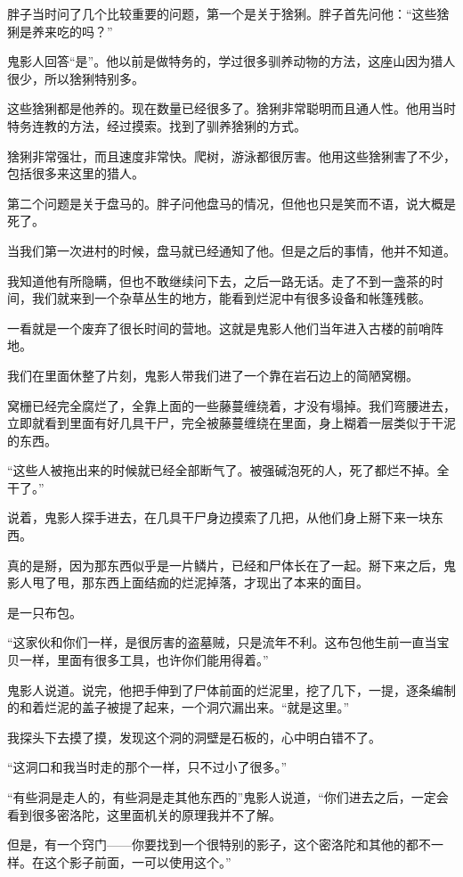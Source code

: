 胖子当时问了几个比较重要的问题，第一个是关于猞猁。胖子首先问他：“这些猞猁是养来吃的吗？”

鬼影人回答“是”。他以前是做特务的，学过很多驯养动物的方法，这座山因为猎人很少，所以猞猁特别多。

这些猞猁都是他养的。现在数量已经很多了。猞猁非常聪明而且通人性。他用当时特务连教的方法，经过摸索。找到了驯养猞猁的方式。

猞猁非常强壮，而且速度非常快。爬树，游泳都很厉害。他用这些猞猁害了不少，包括很多来这里的猎人。

第二个问题是关于盘马的。胖子问他盘马的情况，但他也只是笑而不语，说大概是死了。

当我们第一次进村的时候，盘马就已经通知了他。但是之后的事情，他并不知道。

我知道他有所隐瞒，但也不敢继续问下去，之后一路无话。走了不到一盏茶的时间，我们就来到一个杂草丛生的地方，能看到烂泥中有很多设备和帐篷残骸。

一看就是一个废弃了很长时间的营地。这就是鬼影人他们当年进入古楼的前哨阵地。

我们在里面休整了片刻，鬼影人带我们进了一个靠在岩石边上的简陋窝棚。

窝栅已经完全腐烂了，全靠上面的一些藤蔓缠绕着，才没有塌掉。我们弯腰进去，立即就看到里面有好几具干尸，完全被藤蔓缠绕在里面，身上糊着一层类似于干泥的东西。

“这些人被拖出来的时候就已经全部断气了。被强碱泡死的人，死了都烂不掉。全干了。”

说着，鬼影人探手进去，在几具干尸身边摸索了几把，从他们身上掰下来一块东西。

真的是掰，因为那东西似乎是一片鳞片，已经和尸体长在了一起。掰下来之后，鬼影人甩了甩，那东西上面结痂的烂泥掉落，才现出了本来的面目。

是一只布包。

“这家伙和你们一样，是很厉害的盗墓贼，只是流年不利。这布包他生前一直当宝贝一样，里面有很多工具，也许你们能用得着。”

鬼影人说道。说完，他把手伸到了尸体前面的烂泥里，挖了几下，一提，逐条编制的和着烂泥的盖子被提了起来，一个洞穴漏出来。“就是这里。”

我探头下去摸了摸，发现这个洞的洞壁是石板的，心中明白错不了。

“这洞口和我当时走的那个一样，只不过小了很多。”

“有些洞是走人的，有些洞是走其他东西的”鬼影人说道，“你们进去之后，一定会看到很多密洛陀，这里面机关的原理我并不了解。

但是，有一个窍门——你要找到一个很特别的影子，这个密洛陀和其他的都不一样。在这个影子前面，一可以使用这个。”

